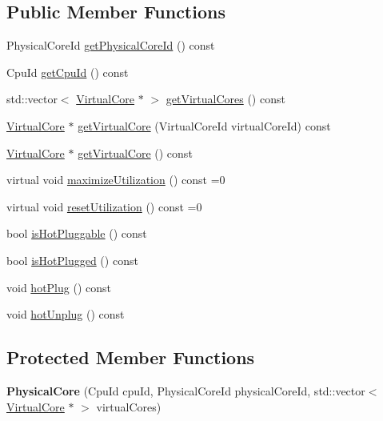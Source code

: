 \subsection*{Public Member Functions}
\begin{DoxyCompactItemize}
\item 
Physical\-Core\-Id \hyperlink{classmammut_1_1topology_1_1PhysicalCore_abbd39ff17b300c2ae85e97b6aaef9152}{get\-Physical\-Core\-Id} () const 
\item 
Cpu\-Id \hyperlink{classmammut_1_1topology_1_1PhysicalCore_a70bbe7bbdac1e9d55894b8360c151510}{get\-Cpu\-Id} () const 
\item 
std\-::vector$<$ \hyperlink{classmammut_1_1topology_1_1VirtualCore}{Virtual\-Core} $\ast$ $>$ \hyperlink{classmammut_1_1topology_1_1PhysicalCore_a72446b61fe3749881b902144fdbdfdbc}{get\-Virtual\-Cores} () const 
\item 
\hyperlink{classmammut_1_1topology_1_1VirtualCore}{Virtual\-Core} $\ast$ \hyperlink{classmammut_1_1topology_1_1PhysicalCore_ad367adc41d16538e33e8b749edb8cc43}{get\-Virtual\-Core} (Virtual\-Core\-Id virtual\-Core\-Id) const 
\item 
\hyperlink{classmammut_1_1topology_1_1VirtualCore}{Virtual\-Core} $\ast$ \hyperlink{classmammut_1_1topology_1_1PhysicalCore_a5e237080edce5bcd70e6b24330e38b37}{get\-Virtual\-Core} () const 
\item 
virtual void \hyperlink{classmammut_1_1topology_1_1PhysicalCore_a2fe21bce321b3401e9108bcf29efafae}{maximize\-Utilization} () const =0
\item 
virtual void \hyperlink{classmammut_1_1topology_1_1PhysicalCore_ad6169b49eb4aa01fa570169735875ffe}{reset\-Utilization} () const =0
\item 
bool \hyperlink{classmammut_1_1topology_1_1PhysicalCore_a3a4e51c4627b001529fc96b1126c4a18}{is\-Hot\-Pluggable} () const 
\item 
bool \hyperlink{classmammut_1_1topology_1_1PhysicalCore_a65ccccb76e5d48629fa4b772ff385643}{is\-Hot\-Plugged} () const 
\item 
void \hyperlink{classmammut_1_1topology_1_1PhysicalCore_af1b157ff00b703d3233b02e2a2e41a15}{hot\-Plug} () const 
\item 
void \hyperlink{classmammut_1_1topology_1_1PhysicalCore_a42ca28fb92c7469b0215612ecad4d1b7}{hot\-Unplug} () const 
\end{DoxyCompactItemize}
\subsection*{Protected Member Functions}
\begin{DoxyCompactItemize}
\item 
\hypertarget{classmammut_1_1topology_1_1PhysicalCore_aaf7e5eb22971ccc42a2455484431c660}{{\bfseries Physical\-Core} (Cpu\-Id cpu\-Id, Physical\-Core\-Id physical\-Core\-Id, std\-::vector$<$ \hyperlink{classmammut_1_1topology_1_1VirtualCore}{Virtual\-Core} $\ast$ $>$ virtual\-Cores)}\label{classmammut_1_1topology_1_1PhysicalCore_aaf7e5eb22971ccc42a2455484431c660}

\end{DoxyCompactItemize}
